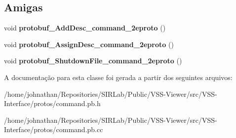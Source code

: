 \subsection*{Amigas}
\begin{DoxyCompactItemize}
\item 
void {\bfseries protobuf\+\_\+\+Add\+Desc\+\_\+command\+\_\+2eproto} ()\hypertarget{classvss__command_1_1Global__Commands_a4825d92f856fcb4b02c67b601c433796}{}\label{classvss__command_1_1Global__Commands_a4825d92f856fcb4b02c67b601c433796}

\item 
void {\bfseries protobuf\+\_\+\+Assign\+Desc\+\_\+command\+\_\+2eproto} ()\hypertarget{classvss__command_1_1Global__Commands_a4c6fb97c25079d49daf010087d869100}{}\label{classvss__command_1_1Global__Commands_a4c6fb97c25079d49daf010087d869100}

\item 
void {\bfseries protobuf\+\_\+\+Shutdown\+File\+\_\+command\+\_\+2eproto} ()\hypertarget{classvss__command_1_1Global__Commands_a4cf10633ad46690f5eec6bdbbcf62de0}{}\label{classvss__command_1_1Global__Commands_a4cf10633ad46690f5eec6bdbbcf62de0}

\end{DoxyCompactItemize}


A documentação para esta classe foi gerada a partir dos seguintes arquivos\+:\begin{DoxyCompactItemize}
\item 
/home/johnathan/\+Repositories/\+S\+I\+R\+Lab/\+Public/\+V\+S\+S-\/\+Viewer/src/\+V\+S\+S-\/\+Interface/protos/command.\+pb.\+h\item 
/home/johnathan/\+Repositories/\+S\+I\+R\+Lab/\+Public/\+V\+S\+S-\/\+Viewer/src/\+V\+S\+S-\/\+Interface/protos/command.\+pb.\+cc\end{DoxyCompactItemize}
